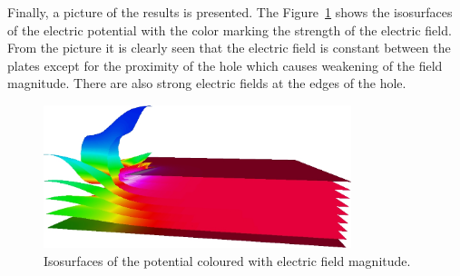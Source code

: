 Finally, a picture of the results is presented. The
Figure~\ref{res_elstat} shows the isosurfaces of the electric
potential with the color marking the strength of the electric
field. From the picture it is clearly seen that the electric field is
constant between the plates except for the proximity of the hole which
causes weakening of the field magnitude. There are also strong
electric fields at the edges of the hole.


\begin{figure}[hbt]
  \centerline{\includegraphics[width=0.8\textwidth]{res_elstat}}
  \caption{Isosurfaces of the potential coloured with electric field
  magnitude.} 
  \label{res_elstat}
\end{figure}



\vfill
\mbox{}

